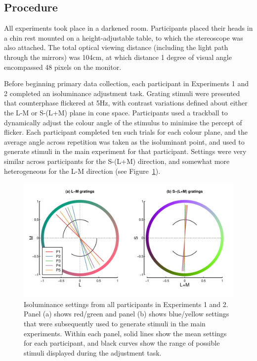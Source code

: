 \documentclass[
  letterpaper,
  DIV=11,
  numbers=noendperiod]{scrartcl}
\begin{document}
\hypertarget{procedure}{%
\subsection{Procedure}\label{procedure}}

All experiments took place in a darkened room. Participants placed their
heads in a chin rest mounted on a height-adjustable table, to which the
stereoscope was also attached. The total optical viewing distance
(including the light path through the mirrors) was 104cm, at which
distance 1 degree of visual angle encompassed 48 pixels on the monitor.

Before beginning primary data collection, each participant in
Experiments 1 and 2 completed an isoluminance adjustment task. Grating
stimuli were presented that counterphase flickered at 5Hz, with contrast
variations defined about either the L-M or S-(L+M) plane in cone space.
Participants used a trackball to dynamically adjust the colour angle of
the stimulus to minimise the percept of flicker. Each participant
completed ten such trials for each colour plane, and the average angle
across repetition was taken as the isoluminant point, and used to
generate stimuli in the main experiment for that participant. Settings
were very similar across participants for the S-(L+M) direction, and
somewhat more heterogeneous for the L-M direction (see
Figure~\ref{fig-isofig}).

\begin{figure}

{\centering \includegraphics{Figures/isosettings.pdf}

}

\caption{\label{fig-isofig}Isoluminance settings from all participants
in Experiments 1 and 2. Panel (a) shows red/green and panel (b) shows
blue/yellow settings that were subsequently used to generate stimuli in
the main experiments. Within each panel, solid lines show the mean
settings for each participant, and black curves show the range of
possible stimuli displayed during the adjustment task.}

\end{figure}
\end{document}
